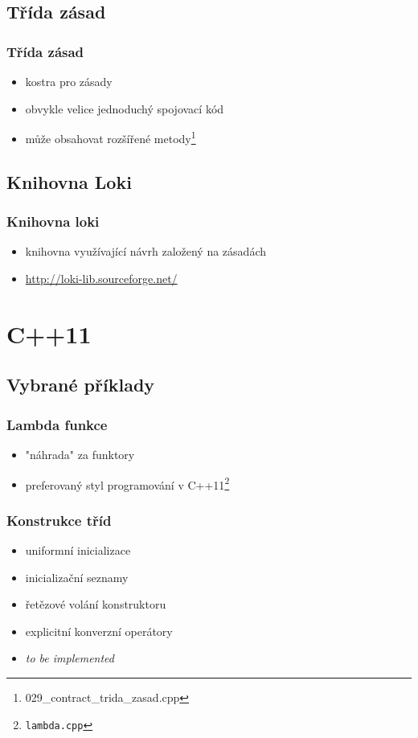 \subsection{Třída zásad}

\begin{frame}
	\frametitle{Třída zásad}
	\begin{itemize}
		\item{kostra pro zásady}
		\item{obvykle velice jednoduchý spojovací kód}
		\item{může obsahovat rozšířené metody\footnote{029\_contract\_trida\_zasad.cpp}}
	\end{itemize}
\end{frame}

\subsection{Knihovna Loki}

\begin{frame} \frametitle{Knihovna loki}
	\begin{itemize}
		\item{knihovna využívající návrh založený na zásadách}
		\item{\url{http://loki-lib.sourceforge.net/}}
	\end{itemize}
\end{frame}

\section{C++11}
\subsection{Vybrané příklady}


\begin{frame} \frametitle{Lambda funkce}
	\begin{itemize}
		\item{"náhrada" za funktory}
		\item{preferovaný styl programování v C++11\footnote{\texttt{lambda.cpp}}}
	\end{itemize}
\end{frame}

\begin{frame} \frametitle{Konstrukce tříd}
	\begin{itemize}
		\item{uniformní inicializace}
		\item{inicializační seznamy}
		\item{řetězové volání konstruktoru}
		\item{explicitní konverzní operátory}
		\item{\textit{to be implemented}}
	\end{itemize}
\end{frame}

